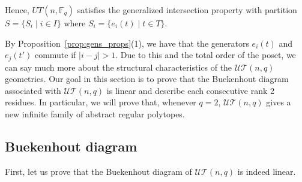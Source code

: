 \documentclass[11pt,letterpaper]{amsart}
\newcommand{\TT}{\mathcal{T}}
\newcommand{\FF}{\mathbb{F}}
\newcommand{\UU}{\mathcal{U}}
\begin{document}
Hence, $UT(n,\FF_q)$ satisfies the generalized intersection property with partition $S = \{S_i\mid i\in I\}$ where $S_i = \{e_i(t)\mid t\in T\}$.

By Proposition~\ref{prop:gens_props}(1), we have that the generators $e_i(t)$ and $e_j(t')$ commute if $|i-j|>1$. Due to this and the total order of the poset, we can say much more about the structural characteristics of the $\UU\TT(n,q)$ geometries. Our goal in this section is to prove that the Buekenhout diagram associated with $\UU\TT(n,q)$ is linear and describe each consecutive rank 2 residues. In particular, we will prove that, whenever $q = 2$, $\UU\TT(n,q)$ gives a new infinite family of abstract regular polytopes.

\subsection{Buekenhout diagram}
First, let us prove that the Buekenhout diagram of $\UU\TT(n,q)$ is indeed linear.
\end{document}
